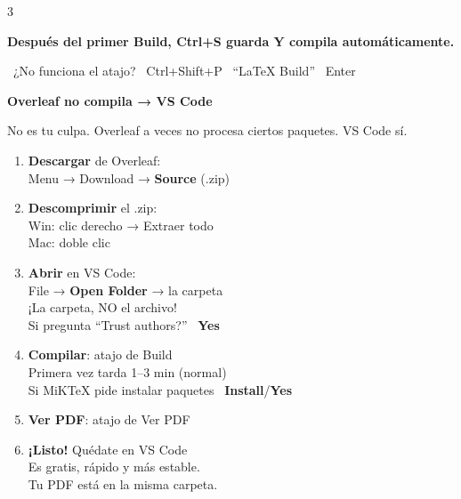 \documentclass[10pt,a4paper,landscape]{article}
\newcommand{\sectiontitle}[2]{%
  \noindent\colorbox{accentblue}{\parbox{\dimexpr\linewidth-2\fboxsep}{%
    \centering\color{white}\bfseries\large #1\quad #2%
  }}%
  \vspace{6pt}%
}
\newcommand{\tipbox}[1]{%
  \noindent\colorbox{accentgreen!10}{\parbox{\dimexpr\linewidth-2\fboxsep}{%
    \color{accentgreen!80!black}\bfseries\faCheckCircle\quad #1%
  }}%
}
\begin{document}
\begin{multicols}{3}
\vspace{6pt}

\tipbox{Después del primer Build, Ctrl+S guarda Y compila automáticamente.}

\vspace{2pt}
{\scriptsize \faQuestionCircle~¿No funciona el atajo? \textrightarrow~Ctrl+Shift+P \textrightarrow~``LaTeX Build'' \textrightarrow~Enter}


\sectiontitle{\faLifeRing}{Overleaf no compila → VS Code}

{\small\color{medgray} No es tu culpa. Overleaf a veces no procesa ciertos paquetes. VS Code sí.}

\vspace{4pt}

\begin{enumerate}[leftmargin=*, itemsep=3pt, font=\bfseries\color{accentblue}]
  \item \textbf{Descargar} de Overleaf:\\
    {\small Menu → Download → \textbf{Source} (.zip)}
  \item \textbf{Descomprimir} el .zip:\\
    {\small Win: clic derecho → Extraer todo\\
    Mac: doble clic}
  \item \textbf{Abrir} en VS Code:\\
    {\small File → \textbf{Open Folder} → la carpeta}\\
    {\small\color{accentred} ¡La carpeta, NO el archivo!}\\
    {\scriptsize Si pregunta ``Trust authors?'' \textrightarrow~\textbf{Yes}}
  \item \textbf{Compilar}: atajo de Build\\
    {\small Primera vez tarda 1--3 min (normal)}\\
    {\scriptsize Si MiKTeX pide instalar paquetes \textrightarrow~\textbf{Install}/\textbf{Yes}}
  \item \textbf{Ver PDF}: atajo de Ver PDF
  \item \textbf{¡Listo!} Quédate en VS Code\\
    {\small Es gratis, rápido y más estable.\\
    Tu PDF está en la misma carpeta.}
\end{enumerate}


\end{multicols}
\end{document}
